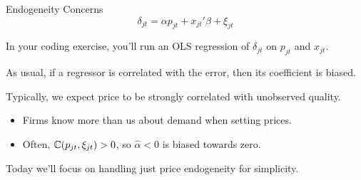 \documentclass[aspectratio=169,t,11pt,table]{beamer}
\begin{document}
\begin{frame}{Endogeneity Concerns}
    \vspace{-\baselineskip}
    \begin{equation*}
        \delta_{jt} = \alpha p_{jt} + x_{jt}'\beta + \xi_{jt}
    \end{equation*}
    \vspace{-0.5\baselineskip}
    \begin{wideitemize}
        \item In your coding exercise, you'll run an OLS regression of $\delta_{jt}$ on $p_{jt}$ and $x_{jt}$.
        \pause
        \item As usual, if a regressor is correlated with the error, then its coefficient is biased.
        \pause
        \item Typically, we expect price to be strongly correlated with unobserved quality.
        \begin{itemize}
            \item Firms know more than us about demand when setting prices.
            \item Often, $\mathbb{C}(p_{jt}, \xi_{jt}) > 0$, so $\hat{\alpha} < 0$ is biased towards zero.
        \end{itemize}
        \pause
        \item Today we'll focus on handling just price endogeneity for simplicity.
    \end{wideitemize}
\end{frame}
\end{document}
